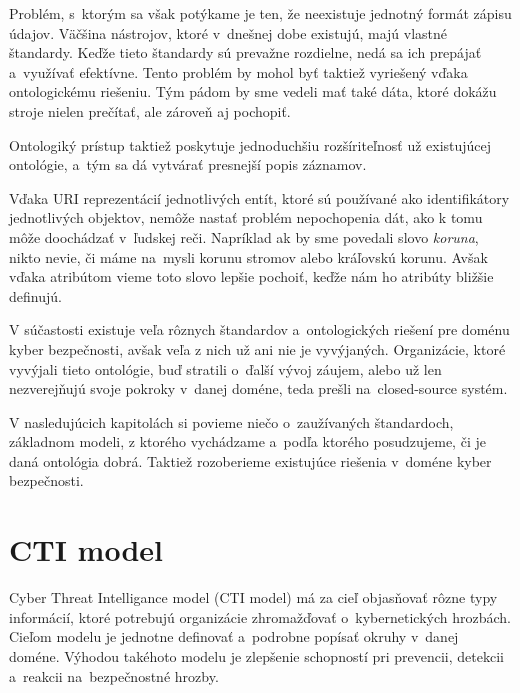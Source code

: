 \documentclass[12pt, a4paper, oneside]{book}
\begin{document}
Problém, s~ktorým sa však potýkame je ten, že neexistuje jednotný formát zápisu údajov. Väčšina nástrojov, ktoré v~dnešnej dobe existujú, majú vlastné štandardy. Keďže tieto štandardy sú prevažne rozdielne, nedá sa ich prepájať a~využívať efektívne. Tento problém by mohol byť taktiež vyriešený vďaka ontologickému riešeniu. Tým pádom by sme vedeli mať také dáta, ktoré dokážu stroje nielen prečítať, ale zároveň aj pochopiť. 
 

Ontologiký prístup taktiež poskytuje jednoduchšiu rozšíriteľnosť už existujúcej ontológie, a~tým sa dá vytvárať presnejší popis záznamov.


Vďaka URI reprezentácií jednotlivých entít, ktoré sú používané ako identifikátory jednotlivých objektov, nemôže nastať problém nepochopenia dát, ako k tomu môže doochádzať v~ľudskej reči. Napríklad ak by sme povedali slovo \textit{koruna}, nikto nevie, či máme na~mysli korunu stromov alebo kráľovskú korunu. Avšak vďaka atribútom vieme toto slovo lepšie pochoiť, keďže nám ho atribúty bližšie definujú.


V súčastosti existuje veľa rôznych štandardov a~ontologických riešení pre doménu kyber bezpečnosti, avšak veľa z nich už ani nie je vyvýjaných. Organizácie, ktoré vyvýjali tieto ontológie, buď stratili o~ďalší vývoj záujem, alebo už len nezverejňujú svoje pokroky v~danej doméne, teda prešli na~closed-source systém.


V nasledujúcich kapitolách si povieme niečo o~zaužívaných štandardoch, základnom modeli, z ktorého vychádzame a~podľa ktorého posudzujeme, či je daná ontológia dobrá. Taktiež rozoberieme existujúce riešenia v~doméne kyber bezpečnosti.

\section{CTI model}
Cyber Threat Intelligance model \citep{MavroeidisB17} (CTI model) má za cieľ objasňovať rôzne typy informácií, ktoré potrebujú organizácie zhromažďovať o~kybernetických hrozbách. Cieľom modelu je jednotne definovať a~podrobne popísať okruhy v~danej doméne. Výhodou takéhoto modelu je zlepšenie schopností pri prevencii, detekcii a~reakcii na~bezpečnostné hrozby.
\end{document}
